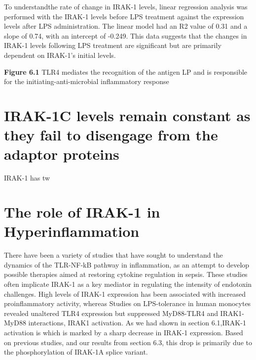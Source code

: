 {To understandthe rate of change in IRAK-1 levels, linear regression
analysis was performed with the IRAK-1 levels before LPS treatment
against the expression levels after LPS administration. The linear model
had an R2 value of 0.31 and a slope of 0.74, with an intercept of
-0.249. This data suggests that the changes in IRAK-1 levels following
LPS treatment are significant but are primarily dependent on IRAK-1's
initial levels.



\textbf{Figure 6.1} TLR4 mediates the recognition of the antigen LP and
is responsible for the initiating-anti-microbial inflammatory response

\section{IRAK-1C levels remain constant as they fail to disengage from
the adaptor proteins
}\label{irak-1c-levels-remain-constant-as-they-fail-to-disengage-from-the-adaptor-proteins}

IRAK-1 has tw


\section{The role of IRAK-1 in Hyperinflammation
}\label{the-role-of-irak-1-in-hyperinflammation}

There have been a variety of studies that have sought to understand the
dynamics of the TLR-NF-kB pathway in inflammation, as an attempt to
develop possible therapies aimed at restoring cytokine regulation in
sepsis. These studies often implicate IRAK-1 as a key mediator in
regulating the intensity of endotoxin challenges. High levels of IRAK-1
expression has been associated with increased proinflammatory activity,
whereas Studies on LPS-tolerance in human monocytes revealed unaltered
TLR4 expression but suppressed MyD88-TLR4 and IRAK1-MyD88 interactions,
IRAK1 activation. As we had shown in section 6.1,IRAK-1 activation is
which is marked by a sharp decrease in IRAK-1 expression. Based on
previous studies, and our results from section 6.3, this drop is
primarily due to the phosphorylation of IRAK-1A splice variant.

}
